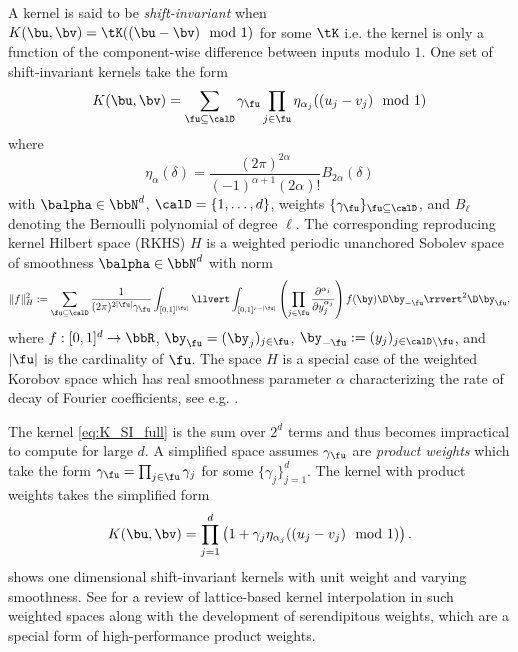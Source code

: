 \documentclass[acmsmall]{acmart}
\begin{document}
A kernel is said to be \emph{shift-invariant} when $K(\bu,\bv) = \tK((\bu-\bv) \mod 1)$ for some $\tK$ i.e. the kernel is only a function of the component-wise difference between inputs modulo $1$. One set of shift-invariant kernels take the form 
\begin{equation}
    K(\bu,\bv) = \sum_{\fu \subseteq \calD} \gamma_\fu \prod_{j \in \fu} \eta_{\alpha_j}((u_j - v_j) \mod 1)
    \label{eq:K_SI_full}
\end{equation}
where 
$$\eta_\alpha(\delta) = \frac{(2\pi)^{2\alpha}}{(-1)^{\alpha+1}(2\alpha)!} B_{2\alpha}(\delta)$$
with $\balpha \in \bbN^d$, $\calD = \{1,\dots,d\}$, weights $\{\gamma_\fu\}_{\fu \subseteq \calD}$, and $B_\ell$ denoting the Bernoulli polynomial of degree $\ell$. The corresponding reproducing kernel Hilbert space (RKHS) $H$ is a weighted periodic unanchored Sobolev space of smoothness $\balpha \in \bbN^d$ with norm 
$$\lVert f \rVert_H^2 := \sum_{\fu \subseteq \calD} \frac{1}{(2 \pi)^{2 \lvert \fu \rvert}\gamma_\fu} \int_{[0,1]^{\lvert \fu \rvert}} \llvert \int_{[0,1]^{s - \lvert \fu \rvert}} \left(\prod_{j \in \fu} \frac{\partial^{\alpha_j}}{\partial y_j^{\alpha_j}}\right) f(\by) \D \by_{- \fu} \rrvert^2 \D \by_\fu, $$
where $f:[0,1]^d \to \bbR$, $\by_\fu = (\by_j)_{j \in \fu}$, $\by_{-\fu} := (y_j)_{j \in \calD \setminus \fu}$, and $\lvert \fu \rvert$ is the cardinality of $\fu$. The space $H$ is a special case of the weighted Korobov space which has real smoothness parameter $\alpha$ characterizing the rate of decay of Fourier coefficients, see e.g. \citep{kaarnioja.kernel_interpolants_lattice_rkhs,kaarnioja.kernel_interpolants_lattice_rkhs_serendipitous,cools2021fast,cools2020lattice,sloan2001tractability,kuo2004lattice}.

The kernel \eqref{eq:K_SI_full} is the sum over $2^d$ terms and thus becomes impractical to compute for large $d$. A simplified space assumes $\gamma_\fu$ are \emph{product weights} which take the form $\gamma_\fu = \prod_{j \in \fu} \gamma_j$ for some $\{\gamma_j\}_{j=1}^d$. The kernel with product weights takes the simplified form 
\begin{equation}
    K(\bu,\bv) = \prod_{j=1}^d \left(1+\gamma_j \eta_{\alpha_j}((u_j-v_j) \mod 1)\right).
    \label{eq:K_SI_prod}
\end{equation}
 shows one dimensional shift-invariant kernels with unit weight and varying smoothness. See \citep{kaarnioja.kernel_interpolants_lattice_rkhs_serendipitous} for a review of lattice-based kernel interpolation in such weighted spaces along with the development of serendipitous weights, which are a special form of high-performance product weights. 
\end{document}
